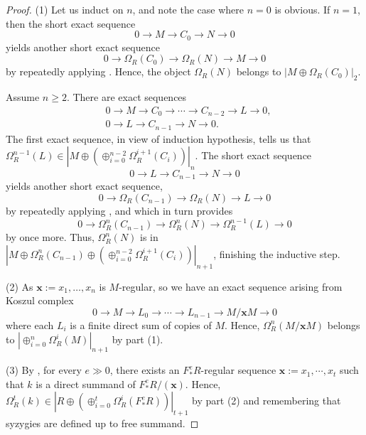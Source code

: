 \documentclass[11pt]{amsart}
\theoremstyle{plain}
\theoremstyle{definition}
\numberwithin{equation}{section}
\numberwithin{theorem}{section}
\begin{document}
\begin{proof}
    (1) Let us induct on $n$, and note the case where $n=0$ is obvious. If $n=1$, then the short exact sequence
    \begin{displaymath}
        0 \to M \to C_0 \to N \to 0
    \end{displaymath}
    yields another short exact sequence
    \begin{displaymath}
        0\to \Omega_R (C_0) \to \Omega_R (N) \to M\to 0    
    \end{displaymath}
    by repeatedly applying \cite[Proposition 2.2(1)]{Dao/Takahashi:2015b}. Hence, the object $\Omega_R (N)$ belongs to $|M\oplus \Omega_R (C_0)|_2$. 
    
    Assume $n\geq 2$. There are exact sequences 
    \begin{displaymath}
        \begin{aligned}
            & 0\to M \to C_0\to \cdots \to C_{n-2}\to L\to 0,
            \\& 0\to L \to C_{n-1}\to N\to 0.
        \end{aligned}
    \end{displaymath}
    The first exact sequence, in view of induction hypothesis, tells us that $\Omega_R^{n-1} (L)\in |M\oplus(\oplus_{i=0}^{n-2} \Omega_R^{i+1}(C_i))|_n$. The short exact sequence 
    \begin{displaymath}
        0\to L \to C_{n-1}\to N\to 0
    \end{displaymath}
    yields another short exact sequence,
    \begin{displaymath}
        0\to \Omega_R (C_{n-1})\to \Omega_R (N) \to L \to 0    
    \end{displaymath}
    by repeatedly applying \cite[Proposition 2.2(1)]{Dao/Takahashi:2015b}, and which in turn provides 
    \begin{displaymath}
        0\to \Omega^n_R (C_{n-1}) \to \Omega^n_R (N) \to \Omega^{n-1}_R  (L) \to 0    
    \end{displaymath}
    by \cite[Proposition 2.2(1)]{Dao/Takahashi:2015b} once more. Thus, $\Omega_R^n (N)$ is in $|M\oplus \Omega_R^n (C_{n-1})\oplus(\oplus_{i=0}^{n-2} \Omega_R^{i+1}(C_i))|_{n+1}$, finishing the inductive step. 

    (2) As $\mathbf x :=x_1,\ldots,x_n$ is $M$-regular, so we have an exact sequence arising from Koszul complex
    \begin{displaymath}
        0\to M \to L_0\to \cdots \to L_{n-1}\to M/\mathbf x M \to 0
    \end{displaymath}
    where each $L_i$ is a finite direct sum of copies of $M$. Hence, $\Omega^n_R(M/\mathbf x M)$ belongs to $|\oplus_{i=0}^n \Omega^i_R (M)|_{n+1}$ by part (1).  

    (3) By \cite[Corollary 3.3]{Takahashi/Yoshino:2004}, for every $e\gg 0$, there exists an $F^e_\ast R$-regular sequence $\mathbf x :=x_1,\cdots,x_t$ such that $k$ is a direct summand of $F^e_\ast R/(\mathbf x)$. Hence, $\Omega^t_R (k) \in |R \oplus (\oplus_{i=0}^t \Omega^i_R (F^e_\ast R))|_{t+1}$ by part (2) and remembering that syzygies are defined up to free summand. 
\end{proof} 
\end{document}
